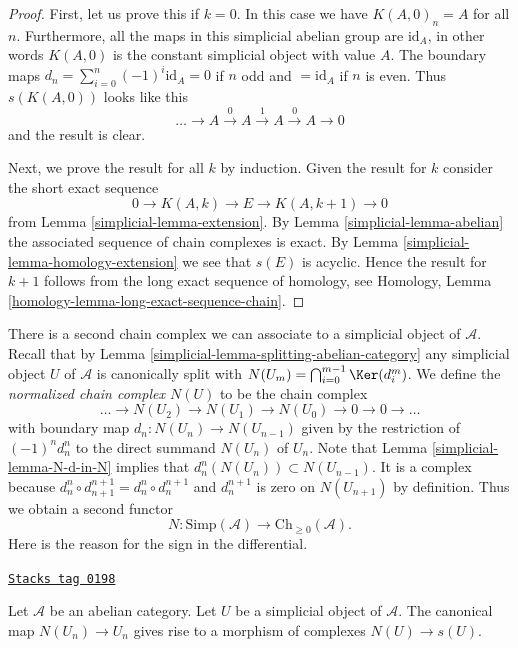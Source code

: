 \begin{proof}

First, let us prove this if $k = 0$.
In this case we have $K(A, 0)_n = A$ for all $n$.
Furthermore, all the maps in this simplicial abelian
group are $\text{id}_A$, in other words $K(A, 0)$
is the constant simplicial object with value $A$.
The boundary maps $d_n = \sum_{i = 0}^n (-1)^i \text{id}_A
= 0$ if $n$ odd and $ = \text{id}_A$ if $n$ is even.
Thus $s(K(A, 0))$ looks like this
$$
\ldots \to A \xrightarrow{0} A \xrightarrow{1} A \xrightarrow{0} A \to 0
$$
and the result is clear.

\medskip\noindent
Next, we prove the result for all $k$ by induction.
Given the result for $k$ consider the short exact sequence
$$
0 \to K(A, k) \to E \to K(A, k + 1) \to 0
$$
from Lemma \ref{simplicial-lemma-extension}.
By Lemma \ref{simplicial-lemma-abelian} the associated sequence of
chain complexes is exact.
By Lemma \ref{simplicial-lemma-homology-extension} we see that
$s(E)$ is acyclic. Hence the result for $k + 1$
follows from the long exact sequence of homology,
see Homology, Lemma \ref{homology-lemma-long-exact-sequence-chain}.
\end{proof}

There is a second chain complex we can associate to
a simplicial object of $\mathcal{A}$. Recall that by
Lemma \ref{simplicial-lemma-splitting-abelian-category}
any simplicial object $U$ of $\mathcal{A}$
is canonically split with
$N(U_m) = \bigcap_{i = 0}^{m - 1} \Ker(d^m_i)$.
We define the {\it normalized chain complex $N(U)$}
to be the chain complex
$$
\ldots \to N(U_2) \to N(U_1) \to N(U_0) \to 0 \to 0 \to \ldots
$$
with boundary map $d_n : N(U_n) \to N(U_{n - 1})$ given
by the restriction of $(-1)^nd^n_n$ to the direct summand
$N(U_n)$ of $U_n$. Note that Lemma \ref{simplicial-lemma-N-d-in-N}
implies that $d^n_n(N(U_n)) \subset N(U_{n - 1})$.
It is a complex because
$d^n_n \circ d^{n + 1}_{n + 1} = d^n_n \circ d^{n + 1}_n$
and $d^{n + 1}_n$ is zero on $N(U_{n + 1})$ by definition.
Thus we obtain a second functor
$$
N : \text{Simp}(\mathcal{A}) \longrightarrow \text{Ch}_{\geq 0}(\mathcal{A}).
$$
Here is the reason for the sign in the differential.

\begin{lemma}
\label{simplicial-lemma-map-associated-complexes}
\href{https://stacks.math.columbia.edu/tag/0198}{\texttt{Stacks tag 0198}}

Let $\mathcal{A}$ be an abelian category.
Let $U$ be a simplicial object of $\mathcal{A}$.
The canonical map $N(U_n) \to U_n$ gives rise to
a morphism of complexes $N(U) \to s(U)$.
\end{lemma}

